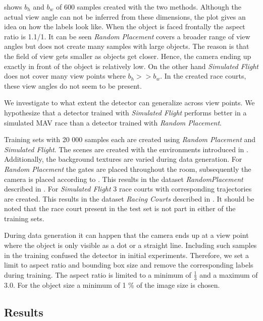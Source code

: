  shows $b_h$ and $b_w$ of 600 samples created with the two methods. Although the actual view angle can not be inferred from these dimensions, the plot gives an idea on how the labels look like. When the object is faced frontally the aspect ratio is 1.1/1. It can be seen  \textit{Random Placement} covers a broader range of view angles but does not create many samples with large objects. The reason is that the field of view gets smaller as objects get closer. Hence, the camera ending up exactly in front of the object is relatively low. On the other hand \textit{Simulated Flight} does not cover many view points where $b_h >> b_w$. In the created race courts, these view angles do not seem to be present.

We investigate to what extent the detector can generalize across view points. We hypothesize that a detector trained with \textit{Simulated Flight} performs better in a simulated \ac{MAV} race than a detector trained with \textit{Random Placement}. 

Training sets with 20 000 samples each are created using \textit{Random Placement} and \textit{Simulated Flight}. The scenes are created with the environments introduced in . Additionally, the background textures are varied during data generation. For \textit{Random Placement} the gates are placed throughout the room, subsequently the camera is placed according to . This results in the dataset \textit{RandomPlacement} described in . For \textit{Simulated Flight} 3 race courts with corresponding trajectories are created. This results in the dataset \textit{Racing Courts} described in . It should be noted that the race court present in the test set is not part in either of the training sets. 

During data generation it can happen that the camera ends up at a view point where the object is only visible as a dot or a straight line. Including such samples in the training confused the detector in initial experiments. Therefore, we set a limit to aspect ratio and bounding box size and remove the corresponding labels during training. The aspect ratio is limited to a minimum  of $\frac{1}{3}$ and a maximum of 3.0. For the object size a minimum of 1 \% of the image size is chosen.


\subsection{Results}

